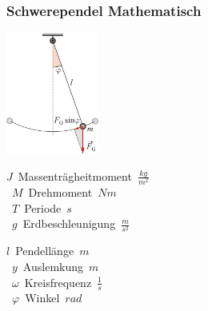 \subsubsection{Schwerependel Mathematisch}
\begin{center}
	\begin{minipage}{0.3\textwidth}
	\end{minipage}%
	\begin{minipage}{0.3\textwidth}
		\includegraphics[height=4cm,keepaspectratio=true]{Images/schwerependel_mathematisch.png}
	\end{minipage}
\end{center}

\begin{center}
	\begin{minipage}{0.3\textwidth}
		\unit{$J$}{Massenträgheitmoment}{$\frac{kg}{m^2}$} \\
		\unit{$M$}{Drehmoment}{$N m$} \\
		\unit{$T$}{Periode}{$s$} \\
		\unit{$g$}{Erdbeschleunigung}{$\frac{m}{s^2}$}
	\end{minipage}%
	\begin{minipage}{0.3\textwidth}
		\unit{$l$}{Pendellänge}{$m$} \\
		\unit{$y$}{Auslemkung}{$m$} \\
		\unit{$\omega$}{Kreisfrequenz}{$\frac{1}{s}$} \\
		\unit{$\varphi$}{Winkel}{$rad$}
	\end{minipage}
\end{center}




